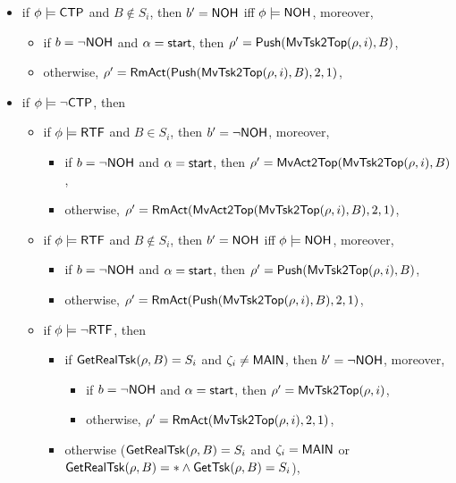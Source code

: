 \begin{itemize}
\begin{itemize}
\begin{itemize}
\begin{itemize}
\begin{itemize}
						\item if $\phi \models{\sf CTP}$ and $B \notin S_i$, then $b' = {\sf NOH}$ iff $\phi \models {\sf NOH}$, moreover, 
						\begin{itemize}
							\item if $b = \neg {\sf NOH}$ and $\alpha = {\mathsf{start} }$, then $\rho'=\mathsf{Push}(\mathsf{MvTsk2Top}(\rho, i), B)$,
							\item otherwise, $\rho' = \mathsf{RmAct}(\mathsf{Push}(\mathsf{MvTsk2Top}(\rho, i), B), 2, 1)$, 
						\end{itemize}
						\item if $\phi \models\neg{\sf CTP}$, then
						\begin{itemize}
							\item if $\phi \models {\sf RTF}$ and $B\in S_i$, then $b' = \neg {\sf NOH}$, moreover,
							\begin{itemize}
								\item if $b = \neg {\sf NOH}$ and $\alpha = {\mathsf{start} }$, then $\rho'=\mathsf{MvAct2Top}(\mathsf{MvTsk2Top}(\rho, i), B)$,
								\item otherwise, $\rho' = \mathsf{RmAct}(\mathsf{MvAct2Top}(\mathsf{MvTsk2Top}(\rho, i), B), 2, 1)$, 
							\end{itemize}
							\item if $\phi \models {\sf RTF}$ and $B\notin S_i$, then $b' = {\sf NOH}$ iff $\phi \models {\sf NOH}$, moreover, 
							\begin{itemize}
								\item if $b = \neg {\sf NOH}$ and $\alpha = {\mathsf{start} }$, then $\rho'=\mathsf{Push}(\mathsf{MvTsk2Top}(\rho, i), B)$,
								\item otherwise, $\rho' = \mathsf{RmAct}(\mathsf{Push}(\mathsf{MvTsk2Top}(\rho, i), B), 2, 1)$, 
							\end{itemize}
							\item if $\phi \models \neg {\sf RTF}$, then
							\begin{itemize}
								\item if $\mathsf{GetRealTsk}(\rho,B) = S_i$ and $\zeta_i \neq {\sf MAIN}$, then $b' = \neg {\sf NOH}$, moreover,
								\begin{itemize}
									\item if $b = \neg {\sf NOH}$ and $\alpha = {\mathsf{start} }$, then $\rho'=\mathsf{MvTsk2Top}(\rho, i)$,
									\item otherwise, $\rho' = \mathsf{RmAct}(\mathsf{MvTsk2Top}(\rho, i), 2, 1)$, 
								\end{itemize}
								\item otherwise ($\mathsf{GetRealTsk}(\rho,B) = S_i$ and $\zeta_i = {\sf MAIN}$ or $\mathsf{GetRealTsk}(\rho,B) = * \wedge\mathsf{GetTsk}(\rho,B) = S_i$), 

\end{itemize}
\end{itemize}
\end{itemize}
\end{itemize}
\end{itemize}
\end{itemize}
\end{itemize}
